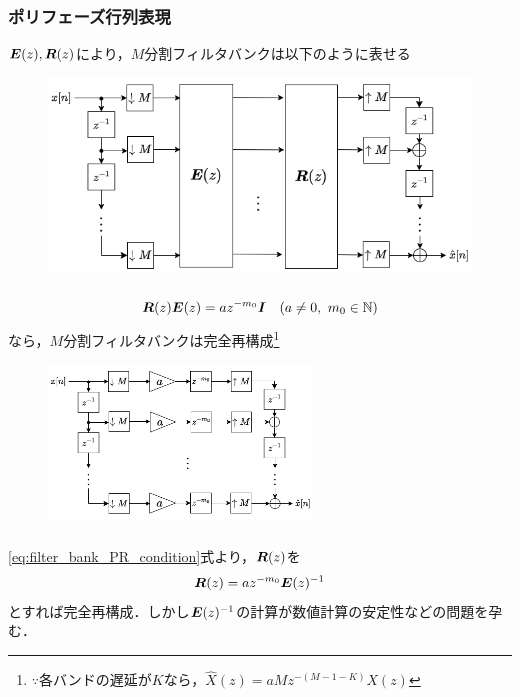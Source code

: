 \documentclass[14pt,xcolor=dvipsnames,table,dvipdfmx]{beamer}
\begin{document}
\begin{frame}[c]
    \frametitle{ポリフェーズ行列表現}
    $\boldsymbol{E}(z), \boldsymbol{R}(z)$により，$M$分割フィルタバンクは以下のように表せる
    \vspace{-13pt}
    \begin{figure}
        \includegraphics[width=120mm]{./figs/polyphase_representation_filter_bank.drawio.png}
    \end{figure}
\end{frame}

\begin{frame}[c]
    \frametitle{}
    \begin{block}{}
        \vspace{-14pt}
        \begin{align}
            \ve{R}(z) \ve{E}(z) = a z^{-m_{0}} \ve{I} \quad (a \neq 0,\ m_{0} \in \mathbb{N}) \label{eq:filter_bank_PR_condition}
        \end{align}
        なら，$M$分割フィルタバンクは完全再構成\footnote{$\because$各バンドの遅延が$K$なら，$\hat{X}(z) = aM z^{-(M - 1 - K)}X(z)$}
    \end{block}
    \begin{figure}
        \includegraphics[width=70mm]{./figs/perfect_reconstraction_filter_bank.drawio.png}
    \end{figure}
\end{frame}

\begin{frame}[c]
    \frametitle{}
    \eqref{eq:filter_bank_PR_condition}式より，$\boldsymbol{R}(z)$を
    \begin{align*}
        \boldsymbol{R}(z) = a z^{-m_{0}} \boldsymbol{E}(z)^{-1}
    \end{align*}
    とすれば完全再構成．しかし$\boldsymbol{E}(z)^{-1}$の計算が数値計算の安定性などの問題を孕む．
\end{frame}
\end{document}
